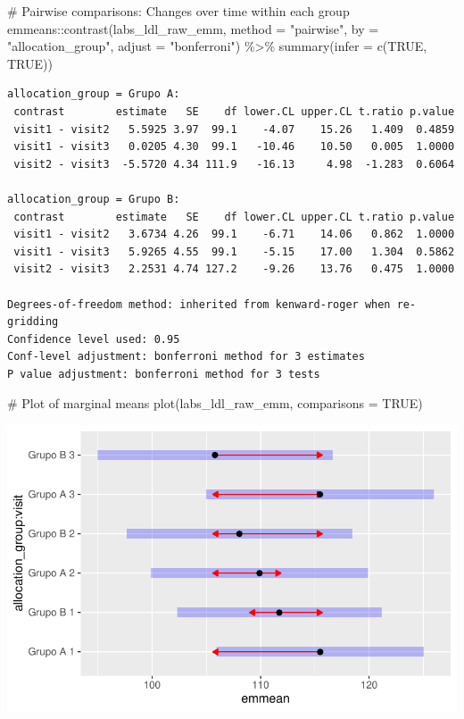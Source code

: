 \documentclass[
  12pt,
]{article}
\newenvironment{Shaded}{\begin{snugshade}}{\end{snugshade}}
\newcommand{\AttributeTok}[1]{\textcolor[rgb]{0.40,0.45,0.13}{#1}}
\newcommand{\CommentTok}[1]{\textcolor[rgb]{0.37,0.37,0.37}{#1}}
\newcommand{\ConstantTok}[1]{\textcolor[rgb]{0.56,0.35,0.01}{#1}}
\newcommand{\FunctionTok}[1]{\textcolor[rgb]{0.28,0.35,0.67}{#1}}
\newcommand{\NormalTok}[1]{\textcolor[rgb]{0.00,0.23,0.31}{#1}}
\newcommand{\SpecialCharTok}[1]{\textcolor[rgb]{0.37,0.37,0.37}{#1}}
\newcommand{\StringTok}[1]{\textcolor[rgb]{0.13,0.47,0.30}{#1}}
\begin{document}
\begin{Shaded}
\begin{Highlighting}[]
\CommentTok{\# Pairwise comparisons: Changes over time within each group}
\NormalTok{emmeans}\SpecialCharTok{::}\FunctionTok{contrast}\NormalTok{(labs\_ldl\_raw\_emm,}
\AttributeTok{method =} \StringTok{"pairwise"}\NormalTok{, }\AttributeTok{by =} \StringTok{"allocation\_group"}\NormalTok{,}
\AttributeTok{adjust =} \StringTok{"bonferroni"}\NormalTok{) }\SpecialCharTok{\%\textgreater{}\%} \FunctionTok{summary}\NormalTok{(}\AttributeTok{infer =} \FunctionTok{c}\NormalTok{(}\ConstantTok{TRUE}\NormalTok{, }\ConstantTok{TRUE}\NormalTok{))}
\end{Highlighting}
\end{Shaded}

\begin{verbatim}
allocation_group = Grupo A:
 contrast        estimate   SE    df lower.CL upper.CL t.ratio p.value
 visit1 - visit2   5.5925 3.97  99.1    -4.07    15.26   1.409  0.4859
 visit1 - visit3   0.0205 4.30  99.1   -10.46    10.50   0.005  1.0000
 visit2 - visit3  -5.5720 4.34 111.9   -16.13     4.98  -1.283  0.6064

allocation_group = Grupo B:
 contrast        estimate   SE    df lower.CL upper.CL t.ratio p.value
 visit1 - visit2   3.6734 4.26  99.1    -6.71    14.06   0.862  1.0000
 visit1 - visit3   5.9265 4.55  99.1    -5.15    17.00   1.304  0.5862
 visit2 - visit3   2.2531 4.74 127.2    -9.26    13.76   0.475  1.0000

Degrees-of-freedom method: inherited from kenward-roger when re-gridding 
Confidence level used: 0.95 
Conf-level adjustment: bonferroni method for 3 estimates 
P value adjustment: bonferroni method for 3 tests 
\end{verbatim}

\begin{Shaded}
\begin{Highlighting}[]
\CommentTok{\# Plot of marginal means}
\FunctionTok{plot}\NormalTok{(labs\_ldl\_raw\_emm, }\AttributeTok{comparisons =} \ConstantTok{TRUE}\NormalTok{)}
\end{Highlighting}
\end{Shaded}

\includegraphics{Outcomes_files/figure-pdf/labs_ldl_raw_emm-1.pdf}
\end{document}
